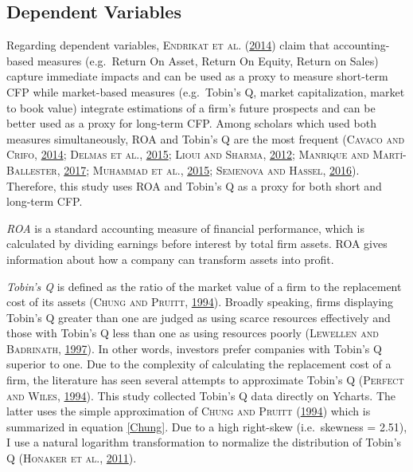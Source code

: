 \documentclass[12pt,]{article}
\begin{document}
\subsection{Dependent Variables}\label{dependent-variables}

Regarding dependent variables, \textsc{Endrikat et al.}
(\protect\hyperlink{ref-EndrikatMakingsenseconflicting2014}{2014}) claim
that accounting-based measures (e.g.~Return On Asset, Return On Equity,
Return on Sales) capture immediate impacts and can be used as a proxy to
measure short-term CFP while market-based measures (e.g.~Tobin's Q,
market capitalization, market to book value) integrate estimations of a
firm's future prospects and can be better used as a proxy for long-term
CFP. Among scholars which used both measures simultaneously, ROA and
Tobin's Q are the most frequent (\textsc{Cavaco and Crifo},
\protect\hyperlink{ref-Cavaco2014}{2014}; \textsc{Delmas et al.},
\protect\hyperlink{ref-Delmas2015}{2015}; \textsc{Lioui and Sharma},
\protect\hyperlink{ref-Lioui2012}{2012}; \textsc{Manrique and
Martí-Ballester},
\protect\hyperlink{ref-ManriqueAnalyzingEffectCorporate2017}{2017};
\textsc{Muhammad et al.},
\protect\hyperlink{ref-Muhammadrelationshipenvironmentalperformance2015}{2015};
\textsc{Semenova and Hassel},
\protect\hyperlink{ref-Semenova2016}{2016}). Therefore, this study uses
ROA and Tobin's Q as a proxy for both short and long-term CFP.

\emph{ROA} is a standard accounting measure of financial performance,
which is calculated by dividing earnings before interest by total firm
assets. ROA gives information about how a company can transform assets
into profit.

\emph{Tobin's Q} is defined as the ratio of the market value of a firm
to the replacement cost of its assets (\textsc{Chung and Pruitt},
\protect\hyperlink{ref-Chung1994}{1994}). Broadly speaking, firms
displaying Tobin's Q greater than one are judged as using scarce
resources effectively and those with Tobin's Q less than one as using
resources poorly (\textsc{Lewellen and Badrinath},
\protect\hyperlink{ref-Lewellen1997}{1997}). In other words, investors
prefer companies with Tobin's Q superior to one. Due to the complexity
of calculating the replacement cost of a firm, the literature has seen
several attempts to approximate Tobin's Q (\textsc{Perfect and Wiles},
\protect\hyperlink{ref-Perfect1994}{1994}). This study collected Tobin's
Q data directly on Ycharts. The latter uses the simple approximation of
\textsc{Chung and Pruitt} (\protect\hyperlink{ref-Chung1994}{1994})
which is summarized in equation \ref{Chung}. Due to a high right-skew
(i.e.~skewness = 2.51), I use a natural logarithm transformation to
normalize the distribution of Tobin's Q (\textsc{Honaker et al.},
\protect\hyperlink{ref-Honaker2011a}{2011}).
\end{document}
